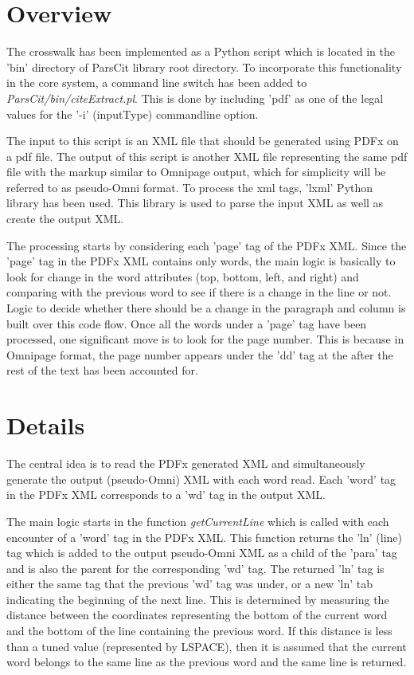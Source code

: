 \section{Overview}
The crosswalk has been implemented as a Python script which is located in the 'bin' directory of ParsCit library root directory.
To incorporate this functionality in the core system, a command line switch has been added to \emph{ParsCit/bin/citeExtract.pl}.
This is done by including 'pdf' as one of the legal values for the '-i' (inputType) commandline option.

The input to this script is an XML file that should be generated using PDFx on a pdf file.
The output of this script is another XML file representing the same pdf file with the markup similar to Omnipage output, which for simplicity will be referred to as pseudo-Omni format.
To process the xml tags, 'lxml' Python library has been used.
This library is used to parse the input XML as well as create the output XML.

The processing starts by considering each 'page' tag of the PDFx XML.
Since the 'page' tag in the PDFx XML contains only words, the main logic is basically to look for change in the word attributes (top, bottom, left, and right) and comparing with the previous word to see if there is a change in the line or not.
Logic to decide whether there should be a change in the paragraph and column is built over this code flow.
Once all the words under a 'page' tag have been processed, one significant move is to look for the page number.
This is because in Omnipage format, the page number appears under the 'dd' tag at the after the rest of the text has been accounted for.

\section{Details}
The central idea is to read the PDFx generated XML and simultaneously generate the output (pseudo-Omni) XML with each word read.
Each 'word' tag in the PDFx XML corresponds to a 'wd' tag in the output XML.

The main logic starts in the function \emph{getCurrentLine} which is called with each encounter of a 'word' tag in the PDFx XML.
This function returns the 'ln' (line) tag which is added to the output pseudo-Omni XML as a child of the 'para' tag and is also the parent for the corresponding 'wd' tag.
The returned 'ln' tag is either the same tag that the previous 'wd' tag was under, or a new 'ln' tab indicating the beginning of the next line.
This is determined by measuring the distance between the coordinates representing the bottom of the current word and the bottom of the line containing the previous word.
If this distance is less than a tuned value (represented by LSPACE), then it is assumed that the current word belongs to the same line as the previous word and the same line is returned.


